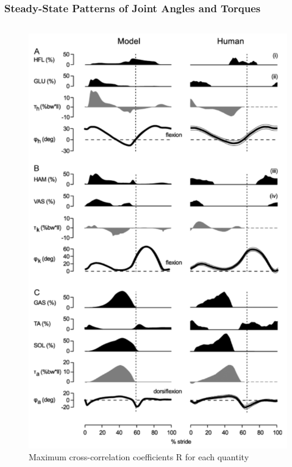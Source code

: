 \documentclass[10pt]{beamer}
\begin{document}
\begin{frame}
	\frametitle{Steady-State Patterns of Joint Angles and Torques}
	
	\begin{columns}
		\begin{column}{.5\textwidth}
			\begin{figure}
				\centering
				\includegraphics[height=.75\textheight]{images/graphic_4.pdf}
				\caption{Maximum cross-correlation coefficients R for each quantity}	
			\end{figure}
		\end{column}
	\end{columns}
\end{frame}
\end{document}
